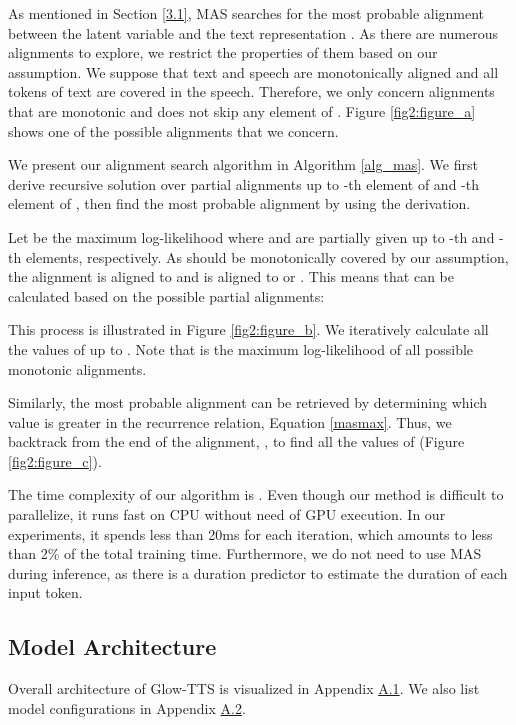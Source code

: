 \documentclass{article}
\begin{document}
As mentioned in Section \ref{3.1}, MAS searches for the most probable alignment  between the latent variable  and the text representation . As there are numerous alignments to explore, we restrict the properties of them based on our assumption. We suppose that text and speech are monotonically aligned and all tokens of text are covered in the speech. Therefore, we only concern alignments that are monotonic and does not skip any element of . Figure \ref{fig2:figure_a} shows one of the possible alignments that we concern.

We present our alignment search algorithm in Algorithm \ref{alg_mas}. We first derive recursive solution over partial alignments up to -th element of  and -th element of , then find the most probable alignment  by using the derivation.

Let  be the maximum log-likelihood where  and  are partially given up to -th and -th elements, respectively. As  should be monotonically covered by our assumption, the alignment  is aligned to  and  is aligned to  or . This means that  can be calculated based on the possible partial alignments: 


This process is illustrated in Figure \ref{fig2:figure_b}. We iteratively calculate all the values of  up to . Note that  is the maximum log-likelihood of all possible monotonic alignments. 

Similarly, the most probable alignment  can be retrieved by determining which  value is greater in the recurrence relation, Equation \ref{masmax}. Thus, we backtrack from the end of the alignment, , to find all the values of  (Figure \ref{fig2:figure_c}).

The time complexity of our algorithm is . Even though our method is difficult to parallelize, it runs fast on CPU without need of GPU execution. In our experiments, it spends less than 20ms for each iteration, which amounts to less than 2\% of the total training time. Furthermore, we do not need to use MAS during inference, as there is a duration predictor to estimate the duration of each input token.

\subsection{Model Architecture}
\label{3.3}
Overall architecture of Glow-TTS is visualized in Appendix \hyperref[appa1]{A.1}. We also list model configurations in Appendix \hyperref[appa2]{A.2}.
\end{document}
